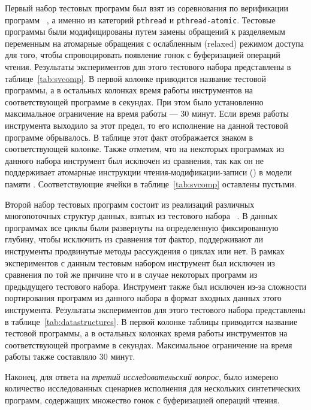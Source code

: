 Первый набор тестовых программ был взят 
из соревнования по верификации программ \SVCOMP~\cite{SVCOMP}, 
а именно из категорий \texttt{pthread} и \texttt{pthread-atomic}.
Тестовые программы были модифицированы путем замены 
обращений к разделяемым переменным на атомарные обращения 
с ослабленным (relaxed) режимом доступа 
для того, чтобы спровоцировать появление гонок с буферизацией операций чтения. 
Результаты экспериментов для этого тестового набора 
представлены в таблице~\ref{tab:svcomp}. 
В первой колонке приводится название тестовой программы, 
а в остальных колонках время работы инструментов 
на соответствующей программе в секундах.
При этом было установленно максимальное ограничение на время работы --- 30 минут.
Если время работы инструмента выходило за этот предел, 
то его исполнение на данной тестовой программе обрывалось. 
В таблице этот факт отображается знаком \timeoutNoSpc
в соответствующей колонке.
Также отметим, что на некоторых программах из данного набора 
инструмент \Nidhugg был исключен из сравнения, так как он не поддерживает 
атомарные инструкции чтения-модификации-записи (\RMW) в модели памяти \POWER. 
Соответствующие ячейки в таблице~\ref{tab:svcomp} оставлены пустыми.



Второй набор тестовых программ состоит из 
реализаций различных многопоточных структур данных, 
взятых из тестового набора \CDSChecker~\cite{Norris-Demsky:OOPSLA2013}. 
В данных программах все циклы были развернуты 
на определенную фиксированную глубину, чтобы исключить из сравнения тот фактор, 
поддерживают ли инструменты продвинутые методы рассуждения о циклах или нет. 
В рамках экспериментов с данным тестовым набором инструмент \Nidhugg 
был исключен из сравнения по той же причине что 
и в случае некоторых программ из предыдущего тестового набора. 
Инструмент \rmem также был исключен из-за сложности портирования 
программ из данного набора в формат входных данных этого инструмента.
Результаты экспериментов для этого тестового набора 
представлены в таблице~\ref{tab:datastructures}. 
В первой колонке таблицы приводится название тестовой программы, 
а в остальных колонках время работы инструментов 
на соответствующей программе в секундах.
Максимальное ограничение на время работы также составляло 30 минут.



Наконец, для ответа на \emph{третий исследовательский вопрос}, 
было измерено количество исследованных \wmc 
сценариев исполнения для нескольких синтетических программ, 
содержащих множество гонок с буферизацией операций чтения. 

